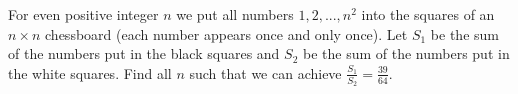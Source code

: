 For even positive integer $n$ we put all numbers $1,2,...,n^2$ into the squares of an $n\times n$ chessboard (each number appears once and only once).
Let $S_1$ be the sum of the numbers put in the black squares and $S_2$ be the sum of the numbers put in the white squares. Find all $n$ such that we can achieve $\frac{S_1}{S_2}=\frac{39}{64}.$